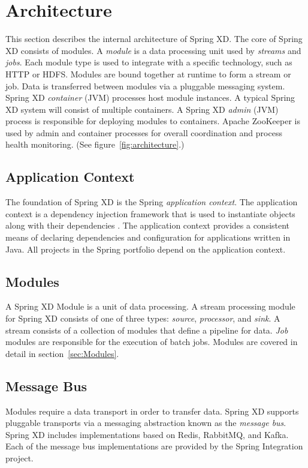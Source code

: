 \section{Architecture}
This section describes the internal architecture of Spring XD. The core of
Spring XD consists of modules. A \emph{module}\cite{modules} is a data processing
unit used by \emph{streams} and \emph{jobs}. Each module type is used to integrate with a specific
technology, such as HTTP or HDFS. Modules are bound together at runtime
to form a stream or job. Data is transferred between modules via a pluggable
messaging system. Spring XD \emph{container} (JVM) processes host module instances.
A typical Spring XD system will consist of multiple containers. A Spring XD
\emph{admin} (JVM) process is responsible for deploying modules to containers.
Apache ZooKeeper\cite{zookeeper} is used by admin and container processes
for overall coordination and process health monitoring. 
(See figure~\ref{fig:architecture}.)

\subsection{Application Context}
The foundation of Spring XD is the Spring \emph{application context}. The application
context is a dependency injection framework that is used to instantiate
objects along with their dependencies \cite{spring-framework-reference}.
The application context provides a consistent means of declaring dependencies
and configuration for applications written in Java. All projects in the
Spring\cite{spring} portfolio depend on the application context.

\subsection{Modules}
A Spring XD Module is a unit of data processing. A stream processing module
for Spring XD consists of one of three types: \emph{source}, \emph{processor}, and \emph{sink}.
A stream consists of a collection of modules that define a pipeline for data.
\emph{Job} modules are responsible for the execution of batch jobs. Modules are
covered in detail in section~\ref{sec:Modules}.

\subsection{Message Bus}
\label{subsec:MessageBus}
Modules require a data transport in order to transfer data. Spring XD
supports pluggable transports via a messaging abstraction known as 
the \emph{message bus}. Spring XD includes implementations based on Redis\cite{redis},
RabbitMQ\cite{rabbitmq}, and Kafka. Each of the message bus implementations are provided
by the Spring Integration project\cite{spring-integration-reference}.

